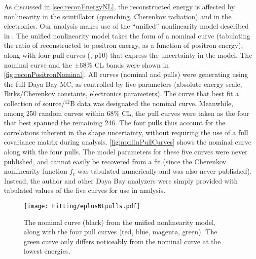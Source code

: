 \documentclass[../thesis.tex]{subfiles}
\begin{document}
As discussed in \autoref{sec:reconEnergyNL}, the reconstructed energy is affected by nonlinearity in the scintillator (quenching, Cherenkov radiation) and in the electronics. Our analysis makes use of the ``unified'' nonlinearity model described in \cite{EnergyModelUpdateYongbo}.
The unified nonlinearity model takes the form of a nominal curve (tabulating the ratio of reconstructed to positron energy, as a function of positron energy), along with four pull curves (\cite{EnergyModelUpdateSoeren}, p10) that express the uncertainty in the model. The nominal curve and the $\pm68\%$ CL bands were shown in \autoref{fig:reconPositronNominal}. All curves (nominal and pulls) were generating using the full Daya Bay MC, as controlled by five parameters (absolute energy scale, Birks/Cherenkov constants, electronics parameters). The curve that best fit a collection of source/$^{12}$B data was designated the nominal curve. Meanwhile, among 250 random curves within 68\% CL, the pull curves were taken as the four that best spanned the remaining 246. The four pulls thus account for the correlations inherent in the shape uncertainty, without requiring the use of a full covariance matrix during analysis. \autoref{fig:nonlinPullCurves} shows the nominal curve along with the four pulls. The model parameters for these five curves were never published, and cannot easily be recovered from a fit (since the Cherenkov nonlinearity function $f_c$ was tabulated numerically and was also never published). Instead, the author and other Daya Bay analyzers were simply provided with tabulated values of the five curves for use in analysis.

\begin{figure}[ht]
  \texttt{[image: Fitting/eplusNLpulls.pdf]}
  \caption{The nominal curve (black) from the unified nonlinearity model, along with the four pull curves (red, blue, magenta, green). The green curve only differs noticeably from the nominal curve at the lowest energies.}
  \label{fig:nonlinPullCurves}
\end{figure}
\end{document}
